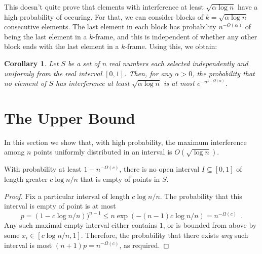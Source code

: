 \documentclass{patmorin}
\newtheorem{cor}{Corollary}
\begin{document}
This doesn't quite prove that elements with interference at least
$\sqrt{\alpha\log n}$ have a high probability of occuring.  For that, we
can consider blocks of $k=\sqrt{\alpha\log n}$ consecutive elements.  The
last element in each block has probability $n^{-O(\alpha)}$ of being the
last element in a $k$-frame, and this is independent of whether any other
block ends with the last element in a $k$-frame.  Using this, we obtain:

\begin{cor}
Let $S$ be a set of $n$ real numbers each selected independently and
uniformly from the real interval $[0,1]$.  Then, for any $\alpha > 0$,
the probability that no element of $S$ has interference at
least $\sqrt{\alpha\log n}$ is at most $e^{-n^{1-O(\alpha)}}$.
\end{cor}

\section{The Upper Bound}

In this section we show that, with high probability, the maximum
interference among $n$ points uniformly distributed in an interval is
$O(\sqrt{\log n})$.

\begin{lem}
With probability at least $1-n^{-\Omega(c)}$, there is no open interval
$I\subseteq[0,1]$ of length greater $c\log n / n$ that is empty of points
in $S$.
\end{lem}

\begin{proof}
Fix a particular interval of length $c\log n /n$.  The probability that
this interval is empty of point is at most
\[
   p = (1-c\log n/n))^{n-1} \le n\exp(-(n-1)c\log n/n) = n^{-\Omega(c)} \enspace .
\]
Any such maximal empty interval either contains $1$, or is bounded from
above by some $x_i\in[c\log n /n,1]$.  Therefore, the probability that
there exists \emph{any} such interval is most $(n+1)p= n^{-\Omega(c)}$,
as required.
\end{proof}
\end{document}
